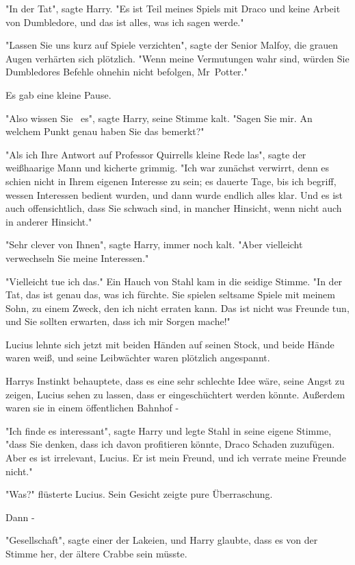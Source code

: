 {"In der Tat", sagte Harry. "Es ist Teil meines Spiels mit Draco und keine Arbeit von Dumbledore, und das ist alles, was ich sagen werde."

"Lassen Sie uns kurz auf Spiele verzichten", sagte der Senior Malfoy, die grauen Augen verhärten sich plötzlich. "Wenn meine Vermutungen wahr sind, würden Sie Dumbledores Befehle ohnehin nicht befolgen, Mr~Potter."

Es gab eine kleine Pause.

"Also wissen Sie ~es", sagte Harry, seine Stimme kalt. "Sagen Sie mir. An welchem Punkt genau haben Sie das bemerkt?"

"Als ich Ihre Antwort auf Professor Quirrells kleine Rede las", sagte der weißhaarige Mann und kicherte grimmig. "Ich war zunächst verwirrt, denn es schien nicht in Ihrem eigenen Interesse zu sein; es dauerte Tage, bis ich begriff, wessen Interessen bedient wurden, und dann wurde endlich alles klar. Und es ist auch offensichtlich, dass Sie schwach sind, in mancher Hinsicht, wenn nicht auch in anderer Hinsicht."

"Sehr clever von Ihnen", sagte Harry, immer noch kalt. "Aber vielleicht verwechseln Sie meine Interessen."

"Vielleicht tue ich das." Ein Hauch von Stahl kam in die seidige Stimme. "In der Tat, das ist genau das, was ich fürchte. Sie spielen seltsame Spiele mit meinem Sohn, zu einem Zweck, den ich nicht erraten kann. Das ist nicht was Freunde tun, und Sie sollten erwarten, dass ich mir Sorgen mache!"

Lucius lehnte sich jetzt mit beiden Händen auf seinen Stock, und beide Hände waren weiß, und seine Leibwächter waren plötzlich angespannt.

Harrys Instinkt behauptete, dass es eine sehr schlechte Idee wäre, seine Angst zu zeigen, Lucius sehen zu lassen, dass er eingeschüchtert werden könnte. Außerdem waren sie in einem öffentlichen Bahnhof -

"Ich finde es interessant", sagte Harry und legte Stahl in seine eigene Stimme, "dass Sie denken, dass ich davon profitieren könnte, Draco Schaden zuzufügen. Aber es ist irrelevant, Lucius. Er ist mein Freund, und ich verrate meine Freunde nicht."

"Was?" flüsterte Lucius. Sein Gesicht zeigte pure Überraschung.

Dann -

"Gesellschaft", sagte einer der Lakeien, und Harry glaubte, dass es von der Stimme her, der ältere Crabbe sein müsste.

}
